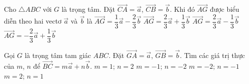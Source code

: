 \begin{ex}%
	Cho $\triangle ABC$ với $G$ là trọng tâm. Đặt $\overrightarrow{CA} = \overrightarrow{a}$, $\overrightarrow{CB} = \overrightarrow{b}$. Khi đó $\overrightarrow{AG}$ được biểu diễn theo hai vectơ $\overrightarrow{a}$ và $\overrightarrow{b}$ là
	\choice
	{$\overrightarrow{AG} = \dfrac{1}{3}\overrightarrow{a} - \dfrac{2}{3}\overrightarrow{b}$}
	{$\overrightarrow{AG} = \dfrac{2}{3}\overrightarrow{a} + \dfrac{1}{3}\overrightarrow{b}$}
	{$\overrightarrow{AG} = \dfrac{2}{3}\overrightarrow{a} - \dfrac{1}{3}\overrightarrow{b}$}
	{\True $\overrightarrow{AG} = -\dfrac{2}{3}\overrightarrow{a} + \dfrac{1}{3}\overrightarrow{b}$}
\end{ex}

\begin{ex}%
	Gọi $G$ là trọng tâm tam giác $ABC$. Đặt $\overrightarrow{GA}=\overrightarrow{a}$, $\overrightarrow{GB}= \overrightarrow{b}$. Tìm các giá trị thực của $m$, $n$ để $ \overrightarrow{BC}= m\overrightarrow{a}+ n\overrightarrow{b}$.
	\choice
	{$m=1$; $n=2$}
	{\True $m=-1$; $n= -2$}
	{$m= -2$; $n=-1$}
	{$m=2$; $n=1$}
\end{ex}

